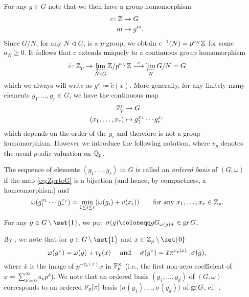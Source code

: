 For any $g\in G$ note that we then have a group homomorphism
\begin{align*}
  c\colon \mathbb{Z} &\to G\\
  m &\mapsto g^m.
\end{align*}
Since $G/N$, for any $N \triangleleft G$, is a $p$-group, we obtain $c^{-1}(N) = p^{a_N}\mathbb{Z}$ for some $a_N\geq0$. It follows that $c$ extends uniquely to a continuous group homomorphism
\begin{equation*}
  \tilde{c} \colon \mathbb{Z}_p \to \varprojlim_{N \triangleleft G} \mathbb{Z}/p^{a_N}\mathbb{Z} \overset{c}{\longrightarrow} \varprojlim_N G/N = G
\end{equation*}
which we always will write as $g^x \coloneqq \tilde{c}(x)$. More generally, for any finitely many elements $g_1,\dotsc,g_r\in G$, we have the continuous map
\begin{equation}\label{eq:ZprtoG}
  \begin{aligned}
    \mathbb{Z}_p^r &\to G \\
    (x_1,\dotsc,x_r) &\mapsto g_1^{x_1}\dotsb g_r^{x_r}
  \end{aligned}
\end{equation}
which depends on the order of the $g_i$ and therefore is not a group homomorphism. However we introduce the following notation, where $v_{p}$ denotes the usual $p$-adic valuation on $\mathbb{Q}_p$.
\begin{definition}
  The sequence of elements $(g_1,\dotsc,g_r)$ in $G$ is called an \emph{ordered basis} of $(G,\omega)$ if the map \eqref{eq:ZprtoG} is a bijection (and hence, by compactness, a homeomorphism) and
  \begin{equation*}
    \omega(g_1^{x_1}\dotsb g_r^{x_r}) = \min_{1 \leq i \leq r}(\omega(g_i)+v(x_i)) \qquad \text{for any } x_1,\dotsc,x_r\in\mathbb{Z}_p.
  \end{equation*}
\end{definition}

\begin{definition}
  For any $g \in G \setminus \set{1}$, we put $\sigma(g) \coloneqq gG_{\omega(g)+} \in \gr G$.
\end{definition}

By \cite[Remark~26.3]{Sch}, we note that for $g \in G \setminus \set{1}$ and $x \in \Z_{p} \setminus \set{0}$
\begin{equation}
  \label{eq:sigma-gx}
  \omega(g^{x}) = \omega(g) + v_{p}(x) \quad \text{ and } \quad \sigma(g^{x}) = \bar{x}\pi^{v_{p}(x)} \,.\, \sigma(g),
\end{equation}
where $\bar{x}$ is the image of $p^{-v_{p}(x)}x$ in $\mathbb{F}_{p}^{\times}$ (i.e., the first non-zero coefficient of $x = \sum_{k=0}^{\infty} a_{k}p^{k}$). We note that an ordered basis $(g_{1},\dotsc,g_{d})$ of $(G,\omega)$ corresponds to an ordered $\mathbb{F}_{p}[\pi]$-basis $\bigl( \sigma(g_{1}), \dotsc, \sigma(g_{d}) \bigr)$ of $\operatorname{gr} G$, cf.\ \cite[Prop.~26.5]{Sch}.

